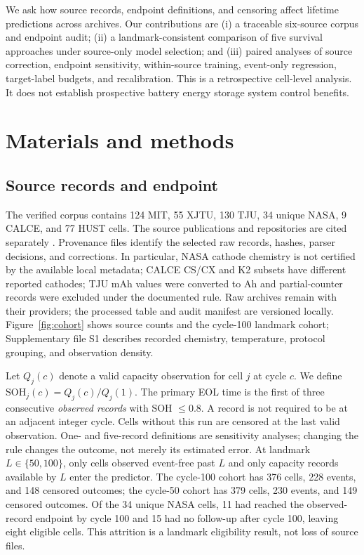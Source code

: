 \documentclass[preprint,12pt]{elsarticle}
\begin{document}
We ask how source records, endpoint definitions, and censoring affect lifetime predictions across archives. Our contributions are (i) a traceable six-source corpus and endpoint audit; (ii) a landmark-consistent comparison of five survival approaches under source-only model selection; and (iii) paired analyses of source correction, endpoint sensitivity, within-source training, event-only regression, target-label budgets, and recalibration. This is a retrospective cell-level analysis. It does not establish prospective battery energy storage system control benefits.

\section{Materials and methods}
\subsection{Source records and endpoint}
The verified corpus contains 124 MIT, 55 XJTU, 130 TJU, 34 unique NASA, 9 CALCE, and 77 HUST cells. The source publications and repositories are cited separately \citep{severson2019,wang2024pin,wang2024dataset,zhu2022tju,zhu2022dataset,saha2007,calce2026,ma2022hust,ma2022hustdata}. Provenance files identify the selected raw records, hashes, parser decisions, and corrections. In particular, NASA cathode chemistry is not certified by the available local metadata; CALCE CS/CX and K2 subsets have different reported cathodes; TJU mAh values were converted to Ah and partial-counter records were excluded under the documented rule. Raw archives remain with their providers; the processed table and audit manifest are versioned locally. Figure~\ref{fig:cohort} shows source counts and the cycle-100 landmark cohort; Supplementary file S1 describes recorded chemistry, temperature, protocol grouping, and observation density.

Let $Q_j(c)$ denote a valid capacity observation for cell $j$ at cycle $c$. We define $\mathrm{SOH}_j(c)=Q_j(c)/Q_j(1)$. The primary EOL time is the first of three consecutive \emph{observed records} with SOH $\leq0.8$. A record is not required to be at an adjacent integer cycle. Cells without this run are censored at the last valid observation. One- and five-record definitions are sensitivity analyses; changing the rule changes the outcome, not merely its estimated error. At landmark $L\in\{50,100\}$, only cells observed event-free past $L$ and only capacity records available by $L$ enter the predictor. The cycle-100 cohort has 376 cells, 228 events, and 148 censored outcomes; the cycle-50 cohort has 379 cells, 230 events, and 149 censored outcomes. Of the 34 unique NASA cells, 11 had reached the observed-record endpoint by cycle 100 and 15 had no follow-up after cycle 100, leaving eight eligible cells. This attrition is a landmark eligibility result, not loss of source files.
\end{document}
